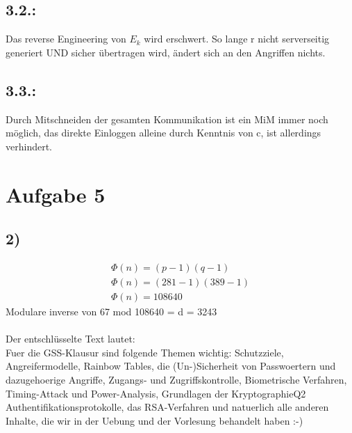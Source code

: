 \documentclass[a4paper,11pt,parskip=half]{scrartcl}
\begin{document}
\subsection*{3.2.:}
Das reverse Engineering von \(E_k\) wird erschwert.
So lange r nicht serverseitig generiert UND sicher übertragen wird, ändert sich an den Angriffen nichts.

\subsection*{3.3.:}
Durch Mitschneiden der gesamten Kommunikation ist ein MiM immer noch möglich, das direkte Einloggen alleine durch Kenntnis von c, ist allerdings verhindert.

\section*{Aufgabe 5}
\subsection*{2)}
\begin{align}
\Phi(n) = (p-1)(q-1)\\
\Phi(n) = (281-1)(389-1)\\
\Phi(n) = 108640
\end{align}
Modulare inverse von 67 mod 108640 = d = 3243
\\\\
Der entschlüsselte Text lautet:
\\
Fuer die GSS-Klausur sind folgende Themen wichtig: Schutzziele, Angreifermodelle, Rainbow Tables, die (Un-)Sicherheit von Passwoertern und dazugehoerige Angriffe, Zugangs- und Zugriffskontrolle, Biometrische Verfahren, Timing-Attack und Power-Analysis, Grundlagen der KryptographieQ2 Authentifikationsprotokolle, das RSA-Verfahren und natuerlich alle anderen Inhalte, die wir in der Uebung und der Vorlesung behandelt haben :-)
\end{document}
